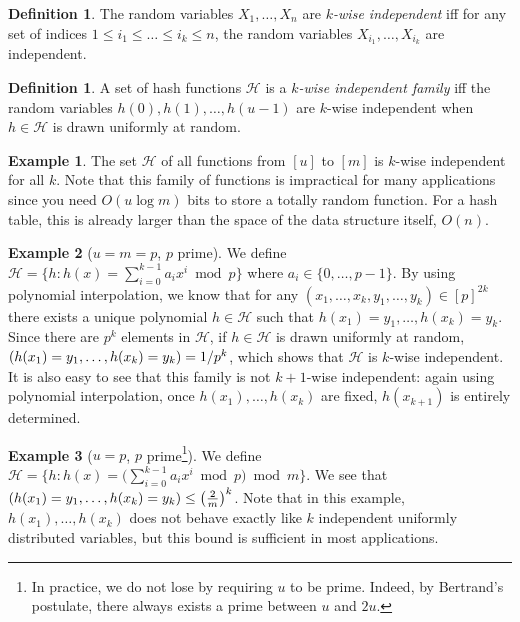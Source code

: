 \documentclass[11pt]{article}
\let\Pr\relax
\DeclareMathOperator*{\Pr}{\mathbb{P}}
\renewcommand{\H}{\mathcal{H}}
\theoremstyle{definition}
\newtheorem*{example}{Example}
\newtheorem{definition}[theorem]{Definition}
\begin{document}
\begin{definition}
    The random variables $X_1,\ldots,X_n$ are \emph{$k$-wise independent} iff
    for any set of indices $1\leq i_1\leq\ldots\leq i_k\leq n$, the random
    variables $X_{i_1},\ldots,X_{i_k}$ are independent.
\end{definition}

\begin{definition}
    A set of hash functions $\H$ is a \emph{$k$-wise independent family} iff
    the random variables $h(0), h(1),\ldots,h(u-1)$ are $k$-wise independent
    when $h\in\H$ is drawn uniformly at random.
\end{definition}

\begin{example}
    The set $\H$ of all functions from $[u]$ to $[m]$ is $k$-wise independent
    for all $k$. Note that this family of functions is impractical for many
    applications since you need $O(u\log m)$ bits to store a totally random
    function. For a hash table, this is already larger than the space of the
    data structure itself, $O(n)$.
\end{example}

\begin{example}[$u=m=p$, $p$ prime] We define $\H = \big\{h: h(x)
    = \sum_{i=0}^{k-1} a_ix^i\bmod p\big\}$ where $a_i\in\{0,\ldots,p-1\}$. By
    using polynomial interpolation, we know that for any \mbox{$(x_1,\ldots,
    x_k, y_1,\ldots,y_k)\in[p]^{2k}$} there exists a unique polynomial $h\in\H$
    such that $h(x_1) = y_1,\ldots, h(x_k) = y_k$.  Since there are $p^k$
    elements in $\H$, if $h\in\H$ is drawn uniformly at random, $\Pr(h(x_1)
    = y_1,\ldots,h(x_k) = y_k) = 1/p^k$, which shows that $\H$ is $k$-wise
    independent. It is also easy to see that this family is not
    \mbox{$k+1$-wise} independent: again using polynomial interpolation, once
    $h(x_1),\ldots,h(x_k)$ are fixed, $h(x_{k+1})$ is entirely determined.
\end{example}

\begin{example}[$u=p$, $p$ prime\footnote{In practice, we do not lose by
    requiring $u$ to be prime. Indeed, by Bertrand's postulate, there always
    exists a prime between $u$ and $2u$.}]
    We define $\H = \big\{h: h(x) = \big(\sum_{i=0}^{k-1}a_i x^i \bmod p\big)
    \bmod m\big\}$. We see that $\Pr(h(x_1) = y_1,\ldots, h(x_k) = y_k)\leq
    \left(\frac{2}{m}\right)^k$. Note that in this example,
    $h(x_1),\ldots,h(x_k)$ does not behave exactly like $k$ independent uniformly
    distributed variables, but this bound is sufficient in most applications.
\end{example}
\end{document}
